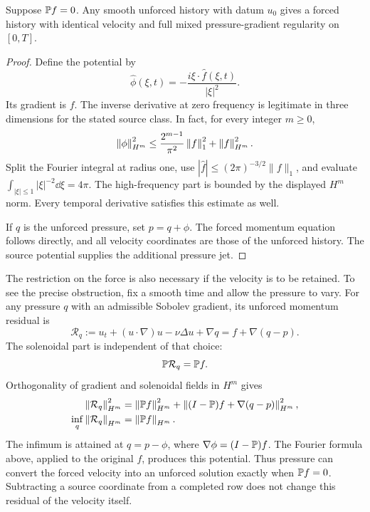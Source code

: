 \begin{proposition}\label{r:prop:potential}
Suppose \(\mathbb P f=0\). Any smooth unforced history with datum \(u_0\)
gives a forced history with identical velocity and full mixed
pressure-gradient regularity on \([0,T]\).
\end{proposition}
\begin{proof}
Define the potential by
\[
 \widehat\phi(\xi,t)=
 -\frac{i\xi\cdot\widehat f(\xi,t)}{|\xi|^2}.
\]
Its gradient is \(f\). The inverse derivative at zero frequency is
legitimate in three dimensions for the stated source class. In fact,
for every integer \(m\ge0\),
\[
 \left\lVert \phi\right\rVert_{H^m}^2
 \le \frac{2^{m-1}}{\pi^2}\left\lVert f\right\rVert_1^2+\left\lVert f\right\rVert_{H^m}^2.
\]
Split the Fourier integral at radius one, use
\(|\widehat f|\le(2\pi)^{-3/2}\|f\|_1\), and evaluate
\(\int_{|\xi|\le1}|\xi|^{-2}\dd\xi=4\pi\).
The high-frequency part is bounded by the displayed \(H^m\) norm.
Every temporal derivative satisfies this estimate as well.

If \(q\) is the unforced pressure, set \(p=q+\phi\).
The forced momentum equation follows directly, and all velocity
coordinates are those of the unforced history. The source potential
supplies the additional pressure jet.
\end{proof}

The restriction on the force is also necessary if the velocity is to be
retained. To see the precise obstruction, fix a smooth time and allow the
pressure to vary. For any pressure \(q\) with an admissible Sobolev gradient,
its unforced momentum residual is
\[
 \mathcal R_q:=u_t+(u\cdot\nabla)u-\nu\Delta u+\nabla q
 =f+\nabla(q-p).
\]
The solenoidal part is independent of that choice:
\[
 \mathbb P\mathcal R_q=\mathbb P f.
\]
Orthogonality of gradient and solenoidal fields in \(H^m\) gives
\begin{equation}
 \begin{aligned}
 \left\lVert \mathcal R_q\right\rVert_{H^m}^2
 &=\left\lVert \mathbb P f\right\rVert_{H^m}^2
   +\left\lVert (I-\mathbb P)f+\nabla(q-p)\right\rVert_{H^m}^2,\\
 \inf_q\left\lVert \mathcal R_q\right\rVert_{H^m}&=\left\lVert \mathbb P f\right\rVert_{H^m}.
 \end{aligned}
 \label{r:eq:pressure-residual-distance}
\end{equation}
The infimum is attained at \(q=p-\phi\), where
\(\nabla\phi=(I-\mathbb P)f\). The Fourier formula above, applied to the
original \(f\), produces this potential. Thus pressure can convert the forced velocity
into an unforced solution exactly when \(\mathbb P f=0\). Subtracting a source
coordinate from a completed row does not change this residual of the
velocity itself.

